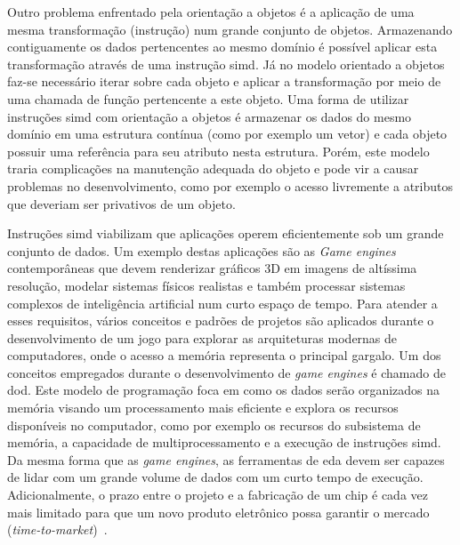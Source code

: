 Outro problema enfrentado pela orientação a objetos é a aplicação de uma mesma transformação (instrução) num grande conjunto de objetos.
Armazenando contiguamente os dados pertencentes ao mesmo domínio é possível aplicar esta transformação através de uma instrução \ac{simd}.
Já no modelo orientado a objetos faz-se necessário iterar sobre cada objeto e aplicar a transformação por meio de uma chamada de função pertencente a este objeto.
Uma forma de utilizar instruções \ac{simd} com orientação a objetos é armazenar os dados do mesmo domínio em uma estrutura contínua (como por exemplo um vetor) e cada objeto possuir uma referência para seu atributo nesta estrutura. Porém, este modelo traria complicações na manutenção adequada do objeto e pode vir a causar problemas no desenvolvimento, como por exemplo o acesso livremente a atributos que deveriam ser privativos de um objeto.

Instruções \ac{simd} viabilizam que aplicações operem eficientemente sob um grande conjunto de dados.
Um exemplo destas aplicações são as \textit{Game engines} contemporâneas que devem renderizar gráficos 3D em imagens de altíssima resolução, modelar sistemas físicos realistas e também processar sistemas complexos de inteligência artificial num curto espaço de tempo.
Para atender a esses requisitos, vários conceitos e padrões de projetos são aplicados durante o desenvolvimento de um jogo para explorar as arquiteturas modernas de computadores, onde o acesso a memória representa o principal gargalo. 
Um dos conceitos empregados durante o desenvolvimento de \textit{game engines} é chamado de \ac{dod}. 
Este modelo de programação foca em como os dados serão organizados na memória visando um processamento mais eficiente e explora os recursos disponíveis no computador, como por exemplo os recursos do subsistema de memória, a capacidade de multiprocessamento e a execução de instruções \ac{simd}.
Da mesma forma que as \textit{game engines}, as ferramentas de \ac{eda} devem ser capazes de lidar com um grande volume de dados com um curto tempo de execução.
Adicionalmente, o prazo entre o projeto e a fabricação de um chip é cada vez mais limitado para que um novo produto eletrônico possa garantir o mercado (\textit{time-to-market})~\cite{papa2011physical}.


